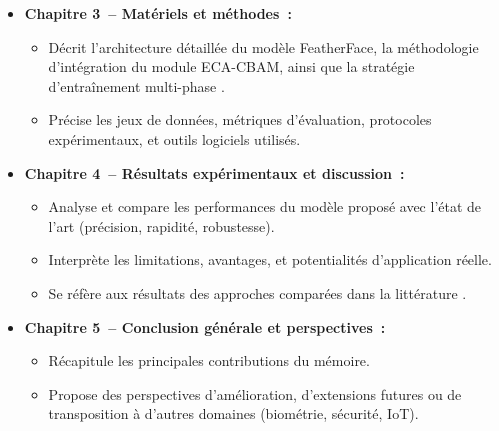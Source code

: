 \begin{onehalfspace}
\begin{itemize}
\item \textbf{Chapitre 3~– Matériels et méthodes~:}
\begin{itemize}
\item Décrit l'architecture détaillée du modèle FeatherFace, la méthodologie d'intégration du module ECA-CBAM, ainsi que la stratégie d'entraînement multi-phase \cite{Wang2024ECACBAM}.
\item Précise les jeux de données, métriques d'évaluation, protocoles expérimentaux, et outils logiciels utilisés.
\end{itemize}

\item \textbf{Chapitre 4~– Résultats expérimentaux et discussion~:}
\begin{itemize}
\item Analyse et compare les performances du modèle proposé avec l'état de l'art (précision, rapidité, robustesse).
\item Interprète les limitations, avantages, et potentialités d'application réelle.
\item Se réfère aux résultats des approches comparées dans la littérature \cite{Kim2025FeatherFace, Wang2024ECACBAM}.
\end{itemize}

\item \textbf{Chapitre 5~– Conclusion générale et perspectives~:}
\begin{itemize}
\item Récapitule les principales contributions du mémoire.
\item Propose des perspectives d'amélioration, d'extensions futures ou de transposition à d'autres domaines (biométrie, sécurité, IoT).
\end{itemize}
\end{itemize}

\end{onehalfspace}
